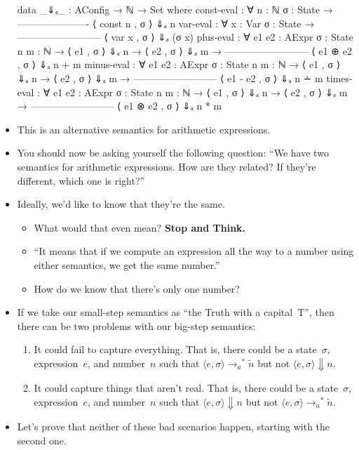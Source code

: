 \documentclass{lecturenotes}
\newcommand{\astep}{\ensuremath{\mathrel{\longrightarrow_a}}}
\begin{document}
\begin{itemize}
\begin{code}
data _⇓ₐ_ : AConfig → ℕ → Set where
  const-eval : ∀ {n : ℕ} {σ : State} →
               ----------------------
                ⟨ const n , σ ⟩ ⇓ₐ n
  var-eval : ∀ {x : Var} {σ : State} →
             --------------------------
               ⟨ var x , σ ⟩ ⇓ₐ (σ x)
  plus-eval : ∀ {e1 e2 : AExpr} {σ : State} {n m : ℕ} →
         ⟨ e1 , σ ⟩ ⇓ₐ n →
         ⟨ e2 , σ ⟩ ⇓ₐ m →
    --------------------------
     ⟨ e1 ⊕ e2 , σ ⟩ ⇓ₐ n + m
  minus-eval : ∀ {e1 e2 : AExpr} {σ : State} {n m : ℕ} →
         ⟨ e1 , σ ⟩ ⇓ₐ n →
         ⟨ e2 , σ ⟩ ⇓ₐ m →
    --------------------------
     ⟨ e1 - e2 , σ ⟩ ⇓ₐ n ∸ m
  times-eval : ∀ {e1 e2 : AExpr} {σ : State} {n m : ℕ} →
         ⟨ e1 , σ ⟩ ⇓ₐ n →
         ⟨ e2 , σ ⟩ ⇓ₐ m →
    --------------------------
     ⟨ e1 ⊗ e2 , σ ⟩ ⇓ₐ n * m    
\end{code}
\item This is an alternative semantics for arithmetic expressions.
\item You should now be asking yourself the following question:
  ``We have two semantics for arithmetic expressions.
  How are they related?
  If they're different, which one is right?''
\item Ideally, we'd like to know that they're the same.
  \begin{itemize}
  \item What would that even mean? \textbf{Stop and Think.}
  \item ``It means that if we compute an expression all the way to a number using either semantics, we get the same number.''
  \item How do we know that there's only one number? 
  \end{itemize}
\item If we take our small-step semantics as ``the Truth with a capital~T'', then there can be two problems with our big-step semantics:
  \begin{enumerate}
  \item It could fail to capture everything.
    That is, there could be a state~$\sigma$, expression~$e$, and number~$n$ such that $\langle e, \sigma\rangle \mathrel{\astep^\ast} \tilde{n}$ but not $\langle e, \sigma\rangle \Downarrow n$.
  \item It could capture things that aren't real.
    That is, there could be a state~$\sigma$, expression~$e$, and number~$n$ such that $\langle e, \sigma\rangle \Downarrow n$ but not $\langle e, \sigma\rangle \mathrel{\astep^\ast} \tilde{n}$.
  \end{enumerate}
\item Let's prove that neither of these bad scenarios happen, starting with the second one.
\end{itemize}
\end{document}
